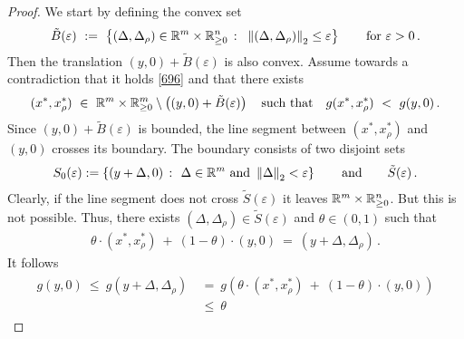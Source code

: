 \begin{proof}
  We start by defining the convex set
  \begin{gather*}
    \tilde{B}(\varepsilon)
    \ 
    :=
    \ 
    \left\{ 
      (
      \Delta,
      \Delta_\rho
      )
      \in
      \R^m \times \R^n_{\ge 0}
      \ 
      \colon
      \ 
      \norm{
      (
      \Delta,
      \Delta_\rho
      )
      }_2
      \le
      \varepsilon
    \right\}
    \qquad
    \text{for}
    \ 
    \varepsilon>0
    \,.
  \end{gather*}
  Then the translation 
  $
  (y,0)
  +
    \tilde{B}(\varepsilon)
  $
  is also convex.
  Assume towards a contradiction that it holds \eqref{696}
  and that there exists 
  \begin{gather}
    \label{698}
  (
x^*,x^*_\rho
  )
  \ 
\in
  \ 
\R^m\times\R^m_{\ge 0}\setminus 
\left(
  (y,0)
  +
    \tilde{B}(\varepsilon)
\right)
\quad
\text{such that}\quad
g
  (
x^*,x^*_\rho
  )
  \ 
  <
  \ 
  g(y,0)
  \,.
  \end{gather}
  Since 
  $
  (y,0)
  +
    \tilde{B}(\varepsilon)
  $
  is bounded, the line segment between 
  $
  (
x^*,x^*_\rho
  )
  $
  and
  $
  (y,0)
  $
  crosses its boundary. The boundary consists of two disjoint sets
  \begin{gather*}
    S_0(\varepsilon)
    :=
    \left\{ 
      (y+\Delta,0)
      \ 
      \colon
      \ 
      \Delta\in\R^m\ 
      \text{and}\ 
      \norm{\Delta}_2<\varepsilon
    \right\}
    \qquad
    \text{and}
    \qquad
    \tilde{S}(\varepsilon)
    \,.
  \end{gather*}
  Clearly, if the line segment does not cross $\tilde{S}(\varepsilon)$ it leaves $\mathbb{R}^m\times\mathbb{R}^n_{\ge 0}$.
  But this is not possible.
  Thus, there exists $(\Delta,\Delta_\rho)\in \tilde{S}(\varepsilon)$ and $\theta\in(0,1)$ such that 
  \begin{gather}
    \label{697}
    \theta 
    \cdot
  (
x^*,x^*_\rho
  )
  \ 
  +
  \ 
  (
  1
  -
\theta
  )
  \cdot
  (y,0)
  \ 
  =
  \ 
  (y+\Delta,\Delta_\rho)
  \,.
  \end{gather}
  It follows
 \begin{align*}
      \begin{split}
      g(y,0)
      \ 
      \le
      \ 
      g
  (y+\Delta,\Delta_\rho)
&
      \ 
      =
      \ 
      g
      \left( 
    \theta 
    \cdot
  (
x^*,x^*_\rho
  )
  \ 
  +
  \ 
  (
  1
  -
\theta
  )
  \cdot
  (y,0)
      \right)
      \\
&
      \ 
      \le
      \ 
    \theta 

\end{split}
\end{align*}
\end{proof}
